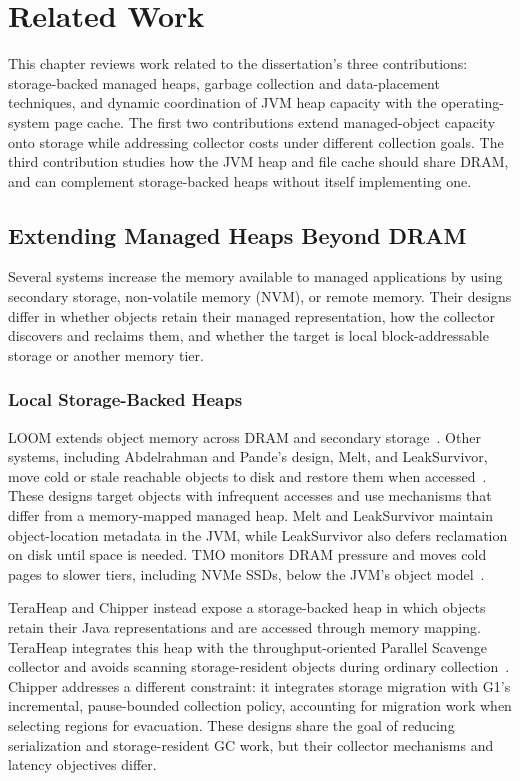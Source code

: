 
\chapter{Related Work}
\label{chapter:related}

This chapter reviews work related to the dissertation's three contributions: storage-backed managed heaps, garbage collection and data-placement techniques, and dynamic coordination of JVM heap capacity with the operating-system page cache.
The first two contributions extend managed-object capacity onto storage while addressing collector costs under different collection goals.
The third contribution studies how the JVM heap and file cache should share DRAM, and can complement storage-backed heaps without itself implementing one.

\section{Extending Managed Heaps Beyond DRAM}

Several systems increase the memory available to managed applications by using secondary storage, non-volatile memory (NVM), or remote memory.
Their designs differ in whether objects retain their managed representation, how the collector discovers and reclaims them, and whether the target is local block-addressable storage or another memory tier.

\subsection{Local Storage-Backed Heaps}

LOOM extends object memory across DRAM and secondary storage~\cite{kaehler:loom}.
Other systems, including Abdelrahman and Pande's design, Melt, and LeakSurvivor, move cold or stale reachable objects to disk and restore them when accessed~\cite{abdelrahman:memorygc,bond:melt,leaksurvivor}.
These designs target objects with infrequent accesses and use mechanisms that differ from a memory-mapped managed heap.
Melt and LeakSurvivor maintain object-location metadata in the JVM, while LeakSurvivor also defers reclamation on disk until space is needed.
TMO monitors DRAM pressure and moves cold pages to slower tiers, including NVMe SSDs, below the JVM's object model~\cite{weiner:tmo}.

TeraHeap and Chipper instead expose a storage-backed heap in which objects retain their Java representations and are accessed through memory mapping.
TeraHeap integrates this heap with the throughput-oriented Parallel Scavenge collector and avoids scanning storage-resident objects during ordinary collection~\cite{teraheap,kolokasis:teracache}.
Chipper addresses a different constraint: it integrates storage migration with G1's incremental, pause-bounded collection policy, accounting for migration work when selecting regions for evacuation.
These designs share the goal of reducing serialization and storage-resident GC work, but their collector mechanisms and latency objectives differ.

